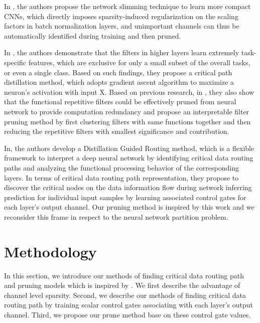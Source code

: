 \documentclass[conference]{IEEEtran}
\begin{document}
In \cite{Liu_2017_ICCV}, the authors propose the network slimming technique to learn more compact CNNs, which directly imposes sparsity-induced regularization on the scaling factors in batch normalization layers, and unimportant channels can thus be automatically identified during training and then pruned.

In \cite{yu2018distilling}, the authors demonstrate that the filters in higher layers learn extremely task-specific features, which are exclusive for only a small subset of the overall tasks, or even a single class. Based on such findings, they propose a critical path distillation method, which adopts gradient ascent algorithm to maximize a neuron’s activation with input X. Based on previous research, in \cite{xiangchenICLR2019}, they also show that the functional repetitive filters could be effectively pruned from neural network to provide computation redundancy and propose an interpretable filter pruning method by first clustering filters with same functions together and then reducing the repetitive filters with smallest significance and contribution.

In\cite{Wang_2018_CVPR}, the authors develop a Distillation Guided Routing method, which is a flexible framework to interpret a deep neural network by identifying critical data routing paths and analyzing the functional processing behavior of the corresponding layers. In terms of critical data routing path representation, they propose to discover the critical nodes on the data information flow during network inferring prediction for individual input samples by learning associated control gates for each layer’s output channel. Our pruning method is inspired by this work and we reconsider this frame in respect to the neural network partition problem.

\section{Methodology}

In this section, we introduce our methods of finding critical data routing path and pruning models which is inspired by \cite{Wang_2018_CVPR, Liu_2017_ICCV, he2017channel, anwar2017structured}. We first describe the advantage of channel level sparsity. Second, we describe our methods of finding critical data routing path by training scalar control gates associating with each layer’s output channel. Third, we propose our prune method base on these control gate values.
\end{document}
